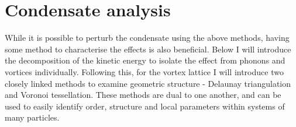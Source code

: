 \section{Condensate analysis}\label{sec:con_analysis}
While it is possible to perturb the condensate using the above methods, having some method to characterise the effects is also beneficial. Below I will introduce the decomposition of the kinetic energy to isolate the effect from phonons and vortices individually. Following this, for the vortex lattice I will introduce two closely linked methods to examine geometric structure - Delaunay triangulation and Voronoi tessellation. These methods are dual to one another, and can be used to easily identify order, structure and local parameters within systems of many particles.

